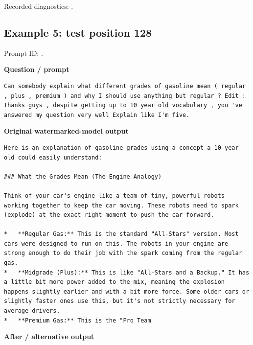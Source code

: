 Recorded diagnostics:
\texttt{}.

\subsection{Example 5: test position
128}\label{record-docs-watermarking-qualitative-text-textseal2-bira-md-example-5-test-position-128}

Prompt ID:
\texttt{}.

\textbf{Question / prompt}

\begin{Verbatim}
Can somebody explain what different grades of gasoline mean ( regular , plus , premium ) and why I should use anything but regular ? Edit : Thanks guys , despite getting up to 10 year old vocabulary , you 've answered my question very well Explain like I'm five.
\end{Verbatim}

\textbf{Original watermarked-model output}

\begin{Verbatim}
Here is an explanation of gasoline grades using a concept a 10-year-old could easily understand:

### What the Grades Mean (The Engine Analogy)

Think of your car's engine like a team of tiny, powerful robots working together to keep the car moving. These robots need to spark (explode) at the exact right moment to push the car forward.

*   **Regular Gas:** This is the standard "All-Stars" version. Most cars were designed to run on this. The robots in your engine are strong enough to do their job with the spark coming from the regular gas.
*   **Midgrade (Plus):** This is like "All-Stars and a Backup." It has a little bit more power added to the mix, meaning the explosion happens slightly earlier and with a bit more force. Some older cars or slightly faster ones use this, but it's not strictly necessary for average drivers.
*   **Premium Gas:** This is the "Pro Team
\end{Verbatim}

\textbf{After / alternative output}

